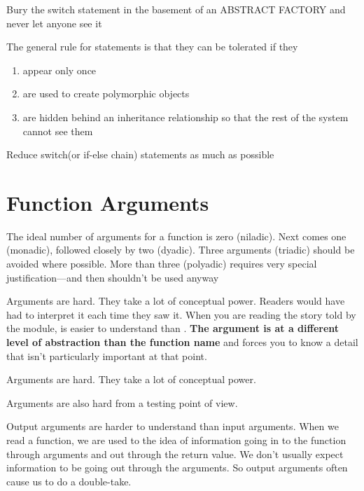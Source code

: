 \begin{marker}
Bury the switch statement in the basement of an ABSTRACT FACTORY and never let anyone see it
\end{marker}

The general rule for  statements is that they can be tolerated if they

\begin{enumerate}
    \item appear only once
    \item are used to create polymorphic objects
    \item are hidden behind an inheritance relationship so that the rest of the system cannot see them
\end{enumerate}

\begin{marker}
Reduce switch(or if-else chain) statements as much as possible
\end{marker}

\section{Function Arguments}

The ideal number of arguments for a function is zero (niladic). Next comes one (monadic), followed closely by two (dyadic). Three arguments (triadic) should be avoided where possible. More than three (polyadic) requires very special justification—and then shouldn't be used anyway

Arguments are hard. They take a lot of conceptual power. Readers
would have had to interpret it each time they saw it. When you are reading the story told by the module,  is easier to understand than . \textbf{The argument is at a different level of abstraction than the function name} and forces you to know a detail that isn't particularly important at that point.

\begin{remark}
Arguments are hard. They take a lot of conceptual power.
\end{remark}

Arguments are also hard from a testing point of view.

Output arguments are harder to understand than input arguments. When we read a function, we are used to the idea of information going in to the function through arguments and out through the return value. We don’t usually expect information to be going out through the arguments. So output arguments often cause us to do a double-take.

